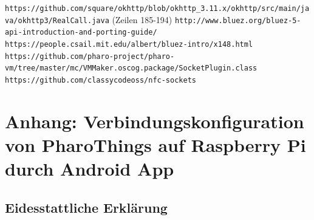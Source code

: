 \documentclass[12pt,a4paper]{article}
\begin{document}
    \renewcommand\refname{Internetquellen}
    \begin{thebibliography}{9}
        \texttt{https://github.com/square/okhttp/blob/okhttp\_3.11.x/\linebreak okhttp/src/main/java/okhttp3/RealCall.java} (Zeilen 185-194)
        \texttt{http://www.bluez.org/bluez-5-api-introduction-and-\linebreak porting-guide/}
        \texttt{https://people.csail.mit.edu/albert/bluez-intro/x148.html}
        \texttt{https://github.com/pharo-project/pharo-vm/tree/\linebreak master/mc/VMMaker.oscog.package/SocketPlugin.class}
        \texttt{https://github.com/classycodeoss/nfc-sockets}
    \end{thebibliography}
    \pagebreak
    
    \section*{Anhang: Verbindungskonfiguration von PharoThings auf Raspberry Pi durch Android App}
    
    \begin{titlepage}
    \section*{Eidesstattliche Erklärung}
    \end{titlepage}
\end{document}
